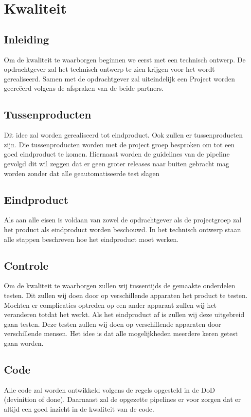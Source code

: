 \documentclass[]{report}
\begin{document}
\chapter{Kwaliteit}

\section{Inleiding}
Om de kwaliteit te waarborgen beginnen we eerst met een technisch ontwerp. De opdrachtgever zal het technisch ontwerp te zien krijgen voor het wordt gerealiseerd. Samen met de opdrachtgever zal uiteindelijk een Project worden gecreëerd volgens de afspraken van de beide partners. 

\section{Tussenproducten}
Dit idee zal worden gerealiseerd tot eindproduct. Ook zullen er tussenproducten zijn. Die tussenproducten worden met de project groep besproken om tot een goed eindproduct te komen. Hiernaast worden de guidelines van de pipeline gevolgd dit wil zeggen dat er geen groter releases naar buiten gebracht mag worden zonder dat alle geautomatiseerde test slagen

\section{Eindproduct}	
Als aan alle eisen is voldaan van zowel de opdrachtgever als de projectgroep zal het product als eindproduct worden beschouwd. In het technisch ontwerp staan alle stappen beschreven hoe het eindproduct moet werken.

\section{Controle}	
Om de kwaliteit te waarborgen zullen wij tussentijds de gemaakte onderdelen testen. Dit zullen wij doen door op verschillende apparaten het product te testen. Mochten er complicaties optreden op een ander apparaat zullen wij het veranderen totdat het werkt. Als het eindproduct af is zullen wij deze uitgebreid gaan testen. Deze testen zullen wij doen op verschillende apparaten door verschillende mensen. Het idee is dat alle mogelijkheden meerdere keren getest gaan worden. 

\section{Code}		
Alle code zal worden ontwikkeld volgens de regels opgesteld in de DoD (devinition of done). Daarnaast zal de opgezette pipelines er voor zorgen dat er altijd een goed inzicht in de kwaliteit van de code.
\end{document}
